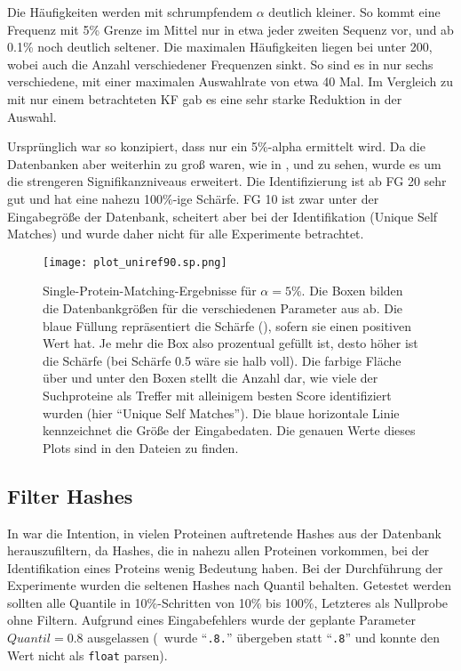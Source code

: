         Die Häufigkeiten werden mit schrumpfendem $\alpha$ deutlich kleiner. So kommt eine Frequenz mit 5\% Grenze im Mittel nur in etwa jeder zweiten Sequenz vor, und ab 0.1\% noch deutlich seltener. Die maximalen Häufigkeiten liegen bei unter 200, wobei auch die Anzahl verschiedener Frequenzen sinkt. So sind es in  nur sechs verschiedene, mit einer maximalen Auswahlrate von etwa 40 Mal. Im Vergleich zu  mit nur einem betrachteten \ac{KF} gab es eine sehr starke Reduktion in der Auswahl.

        Ursprünglich war  so konzipiert, dass nur ein 5\%-alpha ermittelt wird. Da die Datenbanken aber weiterhin zu groß waren, wie in ,  und  zu sehen, wurde es um die strengeren Signifikanzniveaus erweitert. Die Identifizierung ist ab \ac{FG} 20 sehr gut und hat eine nahezu 100\%-ige Schärfe. \ac{FG} 10 ist zwar unter der Eingabegröße der Datenbank, scheitert aber bei der Identifikation (Unique Self Matches) und wurde daher nicht für alle Experimente betrachtet. 

        \begin{figure}[H]
            \centering
            \texttt{[image: plot\_uniref90.sp.png]}
            \caption[Single-Protein-Matching ]{Single-Protein-Matching-Ergebnisse für $\alpha=5\%$. Die Boxen bilden die Datenbankgrößen für die verschiedenen Parameter aus  ab. Die blaue Füllung repräsentiert die Schärfe (), sofern sie einen positiven Wert hat. Je mehr die Box also prozentual gefüllt ist, desto höher ist die Schärfe (bei Schärfe 0.5 wäre sie halb voll). Die farbige Fläche über und unter den Boxen stellt die Anzahl dar, wie viele der Suchproteine als Treffer mit alleinigem besten Score identifiziert wurden (hier ``Unique Self Matches''). Die blaue horizontale Linie kennzeichnet die Größe der Eingabedaten. Die genauen Werte dieses Plots sind in den Dateien  zu finden.}
            \label{fig:uniref90.sp}
        \end{figure}
    \subsection{Filter Hashes} %
        \label{sub:filter_results}
        In  war die Intention, in vielen Proteinen auftretende Hashes aus der Datenbank herauszufiltern, da Hashes, die in nahezu allen Proteinen vorkommen, bei der Identifikation eines Proteins wenig Bedeutung haben. Bei der Durchführung der Experimente wurden die seltenen Hashes nach Quantil behalten. Getestet werden sollten alle Quantile in 10\%-Schritten von 10\% bis 100\%, Letzteres als Nullprobe ohne Filtern. Aufgrund eines Eingabefehlers wurde der geplante Parameter $Quantil=0.8$ ausgelassen (\protfin\ wurde ``\texttt{.8.}'' übergeben statt ``\texttt{.8}'' und konnte den Wert nicht als \texttt{float} parsen).

